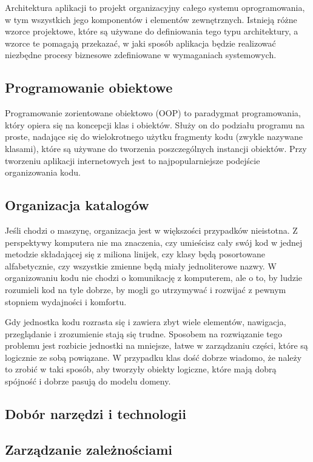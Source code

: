 Architektura aplikacji to projekt organizacyjny całego systemu oprogramowania, w tym wszystkich jego komponentów i elementów zewnętrznych. Istnieją różne wzorce projektowe, które są używane do definiowania tego typu architektury, a wzorce te pomagają przekazać, w jaki sposób aplikacja będzie realizować niezbędne procesy biznesowe zdefiniowane w wymaganiach systemowych.

\subsection{Programowanie obiektowe}

Programowanie zorientowane obiektowo (OOP) to paradygmat programowania, który opiera się na koncepcji klas i obiektów. Służy on do podziału programu na proste, nadające się do wielokrotnego użytku fragmenty kodu (zwykle nazywane klasami), które są używane do tworzenia poszczególnych instancji obiektów. Przy tworzeniu aplikacji internetowych jest to najpopularniejsze podejście organizowania kodu.

\subsection{Organizacja katalogów}

Jeśli chodzi o maszynę, organizacja jest w większości przypadków nieistotna. Z perspektywy komputera nie ma znaczenia, czy umieścisz cały swój kod w jednej metodzie składającej się z miliona linijek, czy klasy będą posortowane alfabetycznie, czy wszystkie zmienne będą miały jednoliterowe nazwy. W organizowaniu kodu nie chodzi o komunikację z komputerem, ale o to, by ludzie rozumieli kod na tyle dobrze, by mogli go utrzymywać i rozwijać z pewnym stopniem wydajności i komfortu.

Gdy jednostka kodu rozrasta się i zawiera zbyt wiele elementów, nawigacja, przeglądanie i zrozumienie stają się trudne. Sposobem na rozwiązanie tego problemu jest rozbicie jednostki na mniejsze, łatwe w zarządzaniu części, które są logicznie ze sobą powiązane. W przypadku klas dość dobrze wiadomo, że należy to zrobić w taki sposób, aby tworzyły obiekty logiczne, które mają dobrą spójność i dobrze pasują do modelu domeny. 

\subsection{Dobór narzędzi i technologii}

\subsection{Zarządzanie zależnościami}

